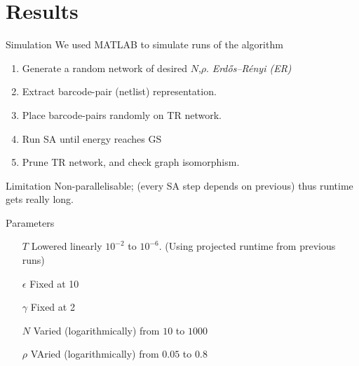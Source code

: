 \documentclass[10pt]{beamer}
\begin{document}
\section{Results}

\begin{frame}[fragile]{Simulation}
    We used MATLAB to simulate runs of the algorithm
    \begin{enumerate}
        \item Generate a random network of desired $N$,$\rho$. \textit{Erdős–Rényi (ER)}
        \item Extract barcode-pair (netlist) representation.
        \item Place barcode-pairs randomly on TR network.
        \item Run SA until energy reaches GS
        \item Prune TR network, and check graph isomorphism.
    \end{enumerate}
    \begin{alertblock}{\centering Limitation}
        Non-parallelisable; (every SA step depends on previous)
        thus runtime gets really long.
    \end{alertblock}
\end{frame}

\begin{frame}[fragile]{Parameters}
    \begin{itemize}
        \item[$T$] Lowered linearly $10^{-2}$ to $10^{-6}$. (Using
            projected runtime from previous runs)
        \item[$\epsilon$] Fixed at 10
        \item[$\gamma$] Fixed at 2
        \item[$N$] Varied (logarithmically) from $10$ to $1000$
        \item[$\rho$] VAried (logarithmically) from $0.05$ to $0.8$
    \end{itemize}
\end{frame}
\end{document}
